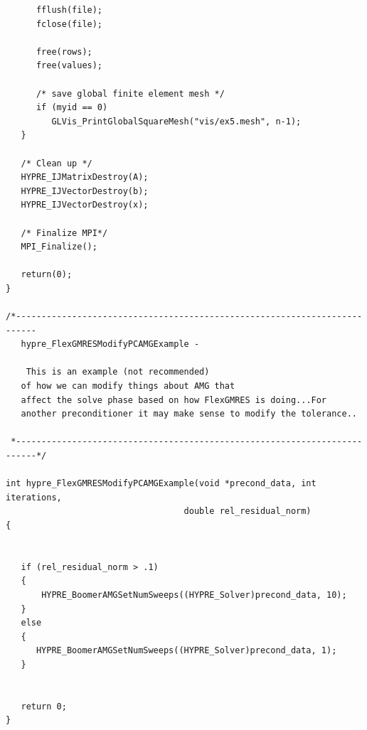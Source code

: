 \documentclass[a4paper,10pt]{article}
\begin{document}
\begin{lstlisting}
      fflush(file);
      fclose(file);

      free(rows);
      free(values);

      /* save global finite element mesh */
      if (myid == 0)
         GLVis_PrintGlobalSquareMesh("vis/ex5.mesh", n-1);
   }

   /* Clean up */
   HYPRE_IJMatrixDestroy(A);
   HYPRE_IJVectorDestroy(b);
   HYPRE_IJVectorDestroy(x);

   /* Finalize MPI*/
   MPI_Finalize();

   return(0);
}

/*--------------------------------------------------------------------------
   hypre_FlexGMRESModifyPCAMGExample -

    This is an example (not recommended)
   of how we can modify things about AMG that
   affect the solve phase based on how FlexGMRES is doing...For
   another preconditioner it may make sense to modify the tolerance..

 *--------------------------------------------------------------------------*/

int hypre_FlexGMRESModifyPCAMGExample(void *precond_data, int iterations,
                                   double rel_residual_norm)
{


   if (rel_residual_norm > .1)
   {
	   HYPRE_BoomerAMGSetNumSweeps((HYPRE_Solver)precond_data, 10);
   }
   else
   {
      HYPRE_BoomerAMGSetNumSweeps((HYPRE_Solver)precond_data, 1);
   }


   return 0;
}

\end{lstlisting}
\end{document}
